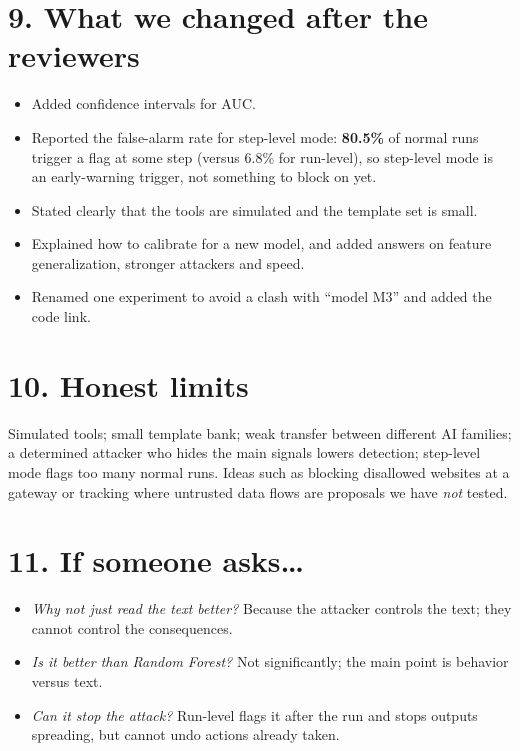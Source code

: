 \documentclass[11pt]{article}
\begin{document}
\section*{9. What we changed after the reviewers}
\begin{itemize}[nosep]
\item Added confidence intervals for AUC.
\item Reported the false-alarm rate for step-level mode: \textbf{80.5\%} of normal runs trigger a flag at some step (versus 6.8\% for run-level), so step-level mode is an early-warning trigger, not something to block on yet.
\item Stated clearly that the tools are simulated and the template set is small.
\item Explained how to calibrate for a new model, and added answers on feature generalization, stronger attackers and speed.
\item Renamed one experiment to avoid a clash with ``model M3'' and added the code link.
\end{itemize}

\section*{10. Honest limits}
Simulated tools; small template bank; weak transfer between different AI families; a determined attacker who hides the main signals lowers detection; step-level mode flags too many normal runs. Ideas such as blocking disallowed websites at a gateway or tracking where untrusted data flows are proposals we have \emph{not} tested.

\section*{11. If someone asks\ldots}
\begin{itemize}[nosep]
\item \textit{Why not just read the text better?} Because the attacker controls the text; they cannot control the consequences.
\item \textit{Is it better than Random Forest?} Not significantly; the main point is behavior versus text.
\item \textit{Can it stop the attack?} Run-level flags it after the run and stops outputs spreading, but cannot undo actions already taken.
\end{itemize}
\end{document}
